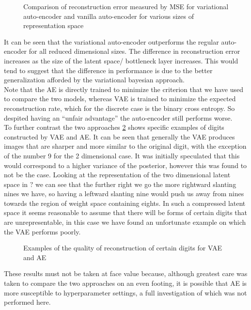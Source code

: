 \documentclass[../report/report.tex]{subfiles}
\begin{document}
\begin{figure}[hbt]
\centering
\hspace{0em}
\caption{Comparison of reconstruction error measured by MSE for variational auto-encoder and vanilla auto-encoder for various sizes of representation space}
\label{fig:AE_MSE}
\end{figure}

It can be seen that the variational auto-encoder outperforms the regular auto-encoder for all reduced dimensional sizes. The difference in reconstruction error increases as the size of the latent space/ bottleneck layer increases. This would tend to suggest that the difference in performance is due to the better generalization afforded by the variational bayesian approach.\\ Note that the AE is directly trained to minimize the criterion that we have used to compare the two models, whereas VAE is trained to minimize the expected reconstruction rate, which for the discrete case is the binary cross entropy. So despited having an ``unfair advantage'' the auto-encoder still performs worse.\\
To further contrast the two approaches \cref{fig:AE_recon} shows specific examples of digits constructed by VAE and AE. It can be seen that generally the VAE produces images that are sharper and more similar to the original digit, with the exception of the number 9 for the 2 dimensional case. It was initially speculated that this would correspond to a higher variance of the posterior, however this was found to not be the case. Looking at the representation of the two dimensional latent space in $?$ we can see that the further right we go the more rightward slanting nines we have, so having a leftward slanting nine would push us away from nines towards the region of weight space containing eights. In such a compressed latent space it seems reasonable to assume that there will be forms of certain digits that are unrepresentable, in this case we have found an unfortunate example on which the VAE performs poorly.\\

\begin{figure}[hbt]
\centering
\hspace{0em}
\caption{Examples of the quality of reconstruction of certain digits for VAE and AE}
\label{fig:AE_recon}
\end{figure}

These results must not be taken at face value because, although greatest care was taken to compare the two approaches on an even footing, it is possible that AE is more susceptible to hyperparameter settings, a full investigation of which was not performed here.\\
\end{document}
